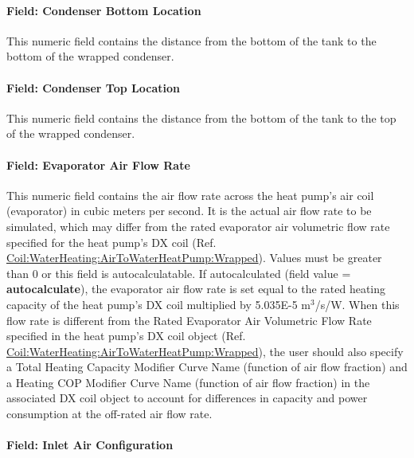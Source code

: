 \paragraph{Field: Condenser Bottom Location}\label{field-condenser-bottom-location}

This numeric field contains the distance from the bottom of the tank to the bottom of the wrapped condenser.

\paragraph{Field: Condenser Top Location}\label{field-condenser-top-location}

This numeric field contains the distance from the bottom of the tank to the top of the wrapped condenser.

\paragraph{Field: Evaporator Air Flow Rate}\label{field-evaporator-air-flow-rate-1}

This numeric field contains the air flow rate across the heat pump's air coil (evaporator) in cubic meters per second. It is the actual air flow rate to be simulated, which may differ from the rated evaporator air volumetric flow rate specified for the heat pump's DX coil (Ref. \hyperref[coilwaterheatingairtowaterheatpumpwrapped]{Coil:WaterHeating:AirToWaterHeatPump:Wrapped}). Values must be greater than 0 or this field is autocalculatable. If autocalculated (field value = \textbf{autocalculate}), the evaporator air flow rate is set equal to the rated heating capacity of the heat pump's DX coil multiplied by 5.035E-5 m\(^{3}\)/s/W. When this flow rate is different from the Rated Evaporator Air Volumetric Flow Rate specified in the heat pump's DX coil object (Ref. \hyperref[coilwaterheatingairtowaterheatpumpwrapped]{Coil:WaterHeating:AirToWaterHeatPump:Wrapped}), the user should also specify a Total Heating Capacity Modifier Curve Name (function of air flow fraction) and a Heating COP Modifier Curve Name (function of air flow fraction) in the associated DX coil object to account for differences in capacity and power consumption at the off-rated air flow rate.

\paragraph{Field: Inlet Air Configuration}\label{field-inlet-air-configuration-1}

